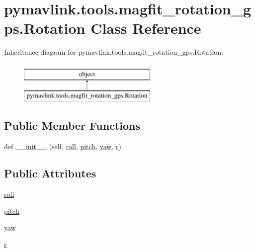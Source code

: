 \hypertarget{classpymavlink_1_1tools_1_1magfit__rotation__gps_1_1Rotation}{}\section{pymavlink.\+tools.\+magfit\+\_\+rotation\+\_\+gps.\+Rotation Class Reference}
\label{classpymavlink_1_1tools_1_1magfit__rotation__gps_1_1Rotation}
Inheritance diagram for pymavlink.\+tools.\+magfit\+\_\+rotation\+\_\+gps.\+Rotation\+:\begin{figure}[H]
\begin{center}
\leavevmode
\includegraphics[height=2.000000cm]{classpymavlink_1_1tools_1_1magfit__rotation__gps_1_1Rotation}
\end{center}
\end{figure}
\subsection*{Public Member Functions}
\begin{DoxyCompactItemize}
\item 
def \mbox{\hyperlink{classpymavlink_1_1tools_1_1magfit__rotation__gps_1_1Rotation_ab9be0c622fdf8819fd9032e96ab74ee9}{\+\_\+\+\_\+init\+\_\+\+\_\+}} (self, \mbox{\hyperlink{classpymavlink_1_1tools_1_1magfit__rotation__gps_1_1Rotation_ac9addebff65d541f375c09c188e2e83f}{roll}}, \mbox{\hyperlink{classpymavlink_1_1tools_1_1magfit__rotation__gps_1_1Rotation_a8a31d2a8c800f4307645b97d6b2ca793}{pitch}}, \mbox{\hyperlink{classpymavlink_1_1tools_1_1magfit__rotation__gps_1_1Rotation_a9b8dd59a13f8403b401a94e2edaae9e5}{yaw}}, \mbox{\hyperlink{classpymavlink_1_1tools_1_1magfit__rotation__gps_1_1Rotation_a4cc244f5b1cd984bcbef5962e620a7a1}{r}})
\end{DoxyCompactItemize}
\subsection*{Public Attributes}
\begin{DoxyCompactItemize}
\item 
\mbox{\hyperlink{classpymavlink_1_1tools_1_1magfit__rotation__gps_1_1Rotation_ac9addebff65d541f375c09c188e2e83f}{roll}}
\item 
\mbox{\hyperlink{classpymavlink_1_1tools_1_1magfit__rotation__gps_1_1Rotation_a8a31d2a8c800f4307645b97d6b2ca793}{pitch}}
\item 
\mbox{\hyperlink{classpymavlink_1_1tools_1_1magfit__rotation__gps_1_1Rotation_a9b8dd59a13f8403b401a94e2edaae9e5}{yaw}}
\item 
\mbox{\hyperlink{classpymavlink_1_1tools_1_1magfit__rotation__gps_1_1Rotation_a4cc244f5b1cd984bcbef5962e620a7a1}{r}}
\end{DoxyCompactItemize}


